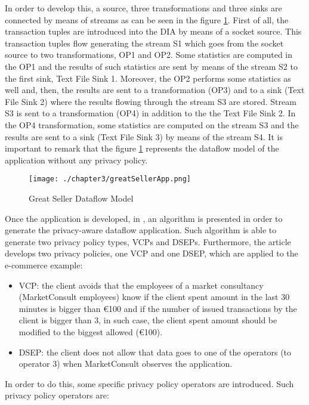 In order to develop this, a source, three transformations and three sinks are connected by means of streams as can be seen in the figure \ref{fig:Great Seller Dataflow Model}. First of all, the transaction tuples are introduced into the DIA by means of a socket source. This transaction tuples flow generating the stream S1 which goes from the socket source to two transformations, OP1 and OP2. Some statistics are computed in the OP1 and the results of such statistics are sent by means of the stream S2 to the first sink, Text File Sink 1. Moreover, the OP2 performs some statistics as well and, then, the results are sent to a transformation (OP3) and to a sink (Text File Sink 2) where the results flowing through the stream S3 are stored. Stream S3 is sent to a transformation (OP4) in addition to the the Text File Sink 2. In the OP4 transformation, some statistics are computed on the stream S3 and the results are sent to a sink (Text File Sink 3) by means of the stream S4. It is important to remark that the figure \ref{fig:Great Seller Dataflow Model} represents the dataflow model of the application without any privacy policy.

\begin{figure}
\centering
{\texttt{[image: ./chapter3/greatSellerApp.png]}}
\caption{Great Seller Dataflow Model}
\label{fig:Great Seller Dataflow Model}
\end{figure}

Once the application is developed, in \cite{privacypoliciesarticle}, an algorithm is presented in order to generate the privacy-aware dataflow application. Such algorithm is able to generate two privacy policy types, VCPs and DSEPs. Furthermore, the article develops two privacy policies, one VCP and one DSEP, which are applied to the e-commerce example:

\begin{itemize}
\item VCP: the client avoids that the employees of a market consultancy (MarketConsult employees) know if the client spent amount in the last 30 minutes is bigger than \euro{100} and if the number of issued transactions by the client is bigger than 3, in such case, the client spent amount should be modified to the biggest allowed (\euro{100}).
\item DSEP: the client does not allow that data goes to one of the operators (to operator 3) when MarketConsult observes the application.
\end{itemize}

In order to do this, some specific privacy policy operators are introduced. Such privacy policy operators are:


